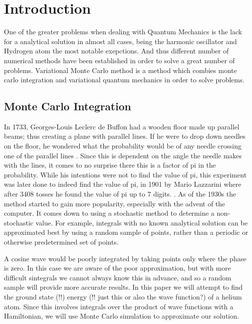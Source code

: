 

\section{Introduction}
One of the greater problems when dealing with Quantum Mechanics is the lack for a analytical solution
in almost all cases, being the harmonic oscillator and Hydrogen atom the most notable exepctions.
And thus different number of numerical methods have been established in order to solve a great number
of problems. Variational Monte Carlo method is a method which combies monte carlo integration and variational
quantum mechanics in order to solve problems.


\subsection{Monte Carlo Integration}
In 1733, Georges-Louis Leclerc
de Buffon had a wooden floor made up parallel beams; thus creating a plane with parallel lines.
If he were to drop down needles on the floor, he wondered what the probability would be of
any needle crossing one of the parallel lines \cite{Buffon}. Since this is dependent on the
angle the needle makes with the lines, it comes to no surprise there this is a factor of pi
in the probability. While his intentions were not to find the value of pi, this experiment
was later done to indeed find the value of pi, in 1901 by Mario Lazzarini where after 3408
tosses he found the value of pi up to 7 digits. \cite{Lazzarini}.
As of the 1930s the method started to gain more popularity, especially with the advent of the computer.
It comes down to using a stochastic method to determine a non-stochastic value. For example, integrals
with no known analytical solution can be approximated best by using a random sample of points, rather than
a periodic or otherwise predetermined set of points.

 A cosine wave would be poorly integrated by taking points
only where the phase is zero. In this case we are aware of the poor approximation, but with more difficult
sintegrals we cannot always know this in advance, and so a random sample will provide more accurate results.
In this paper we will attempt to find the ground state (!!) energy (!! just this or also the wave function?)
of a helium atom. Since this involves integrals over the product of wave functions with a Hamiltonian, we will
use Monte Carlo simulation to approximate our solution.

